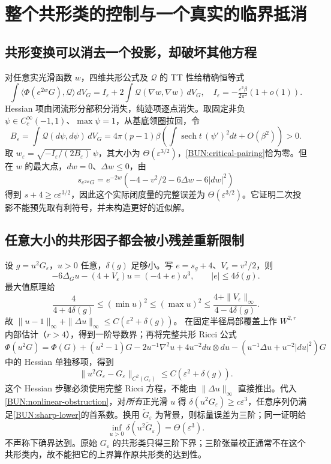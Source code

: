 \documentclass[UTF8,fontset=fandol,zihao=-4,oneside,openany]{ctexbook}
\theoremstyle{cjkplain}
\numberwithin{equation}{chapter}
\begin{document}
\section{整个共形类的控制与一个真实的临界抵消}
\label{BUN:conformal}

\subsection{共形变换可以消去一个投影，却破坏其他方程}
对任意实光滑函数 $w$，四维共形公式及 $\mathcal Q$ 的 TT 性给精确恒等式
\begin{equation}
 \int\langle\Phi(e^{2w}G),\mathcal Q\rangle\,dV_G
 =I_\varepsilon+2\int\mathcal Q(\nabla w,\nabla w)\,dV_G,
 \quad I_\varepsilon=-\tfrac{\varepsilon^3\beta}{2\pi^2}(1+o(1)).
 \label{BUN:critical-pairing}
\end{equation}
Hessian 项由闭流形分部积分消失，纯迹项逐点消失。取固定非负 $\psi\in C_c^\infty(-1,1)$、$\max\psi=1$，从基底领圈拉回，令
\[
 B_\varepsilon=\int\mathcal Q(d\psi,d\psi)\,dV_G
 =4\pi(p-1)\beta\left(\int\operatorname{sech}t\,(\psi')^2dt+O(\beta^2)\right)>0.
\]
取 $w_\varepsilon=\sqrt{-I_\varepsilon/(2B_\varepsilon)}\,\psi$，其大小为 $\Theta(\varepsilon^{3/2})$，\eqref{BUN:critical-pairing}恰为零。但在 $w$ 的最大点，$dw=0$、$\Delta w\le0$，由
\[
 s_{e^{2w}G}=e^{-2w}(-4-v^2/2-6\Delta w-6|dw|^2)
\]
得到 $s+4\ge c\varepsilon^{3/2}$，因此这个实际闭度量的完整误差为 $\Theta(\varepsilon^{3/2})$。它证明二次投影不能预先取有利符号，并未构造更好的近似解。

\subsection{任意大小的共形因子都会被小残差重新限制}
设 $g=u^2G_\varepsilon$，$u>0$ 任意，$\delta(g)$ 足够小。写 $e=s_g+4$、$V_\varepsilon=v^2/2$，则
\[
 -6\Delta_Gu-(4+V_\varepsilon)u=(-4+e)u^3,
 \qquad |e|\le4\delta(g).
\]
最大值原理给
\[
 \frac4{4+4\delta(g)}\le(\min u)^2\le(\max u)^2
 \le\frac{4+\|V_\varepsilon\|_\infty}{4-4\delta(g)}.
\]
故 $\|u-1\|_\infty+\|\Delta u\|_\infty\le C(\varepsilon^2+\delta(g))$。
在固定半径局部覆盖上作 $W^{2,r}$ 内部估计（$r>4$），得到一阶导数界；再将完整共形 Ricci 公式
\[
 \Phi(u^2G)=\Phi(G)+(u^2-1)G-2u^{-1}\nabla^2u+4u^{-2}du\otimes du
 -(u^{-1}\Delta u+u^{-2}|du|^2)G
\]
中的 Hessian 单独移项，得到
\begin{equation}
 \|u^2G_\varepsilon-G_\varepsilon\|_{C^2(G_\varepsilon)}
 \le C(\varepsilon^2+\delta(g)).
 \label{BUN:conformal-bootstrap}
\end{equation}
这个 Hessian 步骤必须使用完整 Ricci 方程，不能由 $\|\Delta u\|_\infty$ 直接推出。代入\eqref{BUN:nonlinear-obstruction}，对\emph{所有}正光滑 $u$ 得 $\delta(u^2G_\varepsilon)\ge c\varepsilon^3$，任意序列仍满足\eqref{BUN:sharp-lower}的首系数。换用 $\widetilde G_\varepsilon$ 为背景，则标量误差为三阶；同一证明给
\begin{equation}
 \boxed{\inf_{u>0}\delta(u^2\widetilde G_\varepsilon)=\Theta(\varepsilon^3).}
 \label{BUN:whole-conformal-third}
\end{equation}
不声称下确界达到。原始 $G_\varepsilon$ 的共形类只得三阶下界；三阶张量校正通常不在这个共形类内，故不能把它的上界算作原共形类的达到性。
\end{document}
